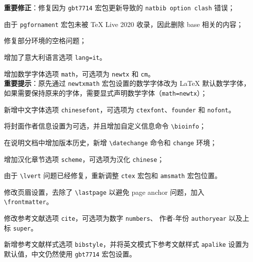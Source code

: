 \documentclass[lang=cn,10pt]{elegantbook}
\begin{document}

\begin{change}
  \item \textbf{重要修正}：修复因为 \lstinline{gbt7714} 宏包更新导致的 \lstinline{natbib option clash} 错误；
  \item 由于 \lstinline{pgfornament} 宏包未被 \TeX{} Live 2020 收录，因此删除 base 相关的内容；
  \item 修复部分环境的空格问题；
  \item 增加了意大利语言选项 \lstinline{lang=it}。
\end{change}



\begin{change}
  \item 增加数学字体选项 \lstinline{math}，可选项为 \lstinline{newtx} 和 \lstinline{cm}。\\
  \textbf{重要提示}：原先通过 \lstinline{newtxmath} 宏包设置的数学字体改为 \LaTeX{} 默认数学字体，如果需要保持原来的字体，需要显式声明数学字体（\lstinline{math=newtx}）；
  \item 新增中文字体选项 \lstinline{chinesefont}，可选项为 \lstinline{ctexfont}、\lstinline{founder} 和 \lstinline{nofont}。
  \item 将封面作者信息设置为可选，并且增加自定义信息命令 \lstinline{\bioinfo}；
  \item 在说明文档中增加版本历史，新增 \lstinline{\datechange} 命令和 \lstinline{change} 环境；
  \item 增加汉化章节选项 \lstinline{scheme}，可选项为汉化 \lstinline{chinese}；
  \item 由于 \lstinline{\lvert} 问题已经修复，重新调整 \lstinline{ctex} 宏包和 \lstinline{amsmath} 宏包位置。
  \item 修改页眉设置，去除了 \lstinline{\lastpage} 以避免 page anchor 问题，加入 \lstinline{\frontmatter}。
  \item 修改参考文献选项 \lstinline{cite}，可选项为数字 \lstinline{numbers}、 作者-年份 \lstinline{authoryear} 以及上标 \lstinline{super}。
  \item 新增参考文献样式选项 \lstinline{bibstyle}，并将英文模式下参考文献样式 \lstinline{apalike} 设置为默认值，中文仍然使用 \lstinline{gbt7714} 宏包设置。
\end{change}

\end{document}

